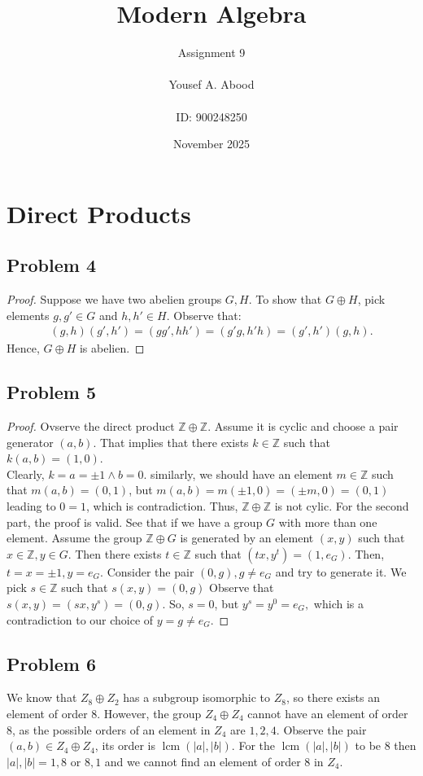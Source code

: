 \documentclass[a4paper,12pt]{article}
\title{Modern Algebra}
\author{Assignment 9\\ \\ Yousef A. Abood\\ \\ ID: 900248250}
\date{November 2025}
\begin{document}
\maketitle
\noindent\makebox[\linewidth]{\rule{15cm}{0.4pt}}
\section{Direct Products}
\subsection*{Problem 4}
\begin{proof}
    Suppose we have two abelien groups $G,H$. To show that $G \oplus H$, pick elements $g,g' \in G$ and $h,h' \in H$. Observe that:
    \begin{align*}
        (g,h)(g',h')=(gg',hh')=(g'g,h'h)=(g',h')(g,h).
    \end{align*}
    Hence, $G \oplus H$ is abelien.
\end{proof}
\subsection*{Problem 5}
\begin{proof}
    Ovserve the direct product $\mathbb{Z}\oplus \mathbb{Z}.$ Assume it is cyclic and choose a pair generator $(a,b)$. That implies that there exists $k \in \mathbb{Z}$ such that $k(a,b)=(1,0).$ \\Clearly, $k=a=\pm 1 \wedge b=0.$ similarly, we should have an element $m \in \mathbb{Z}$ such that $m(a,b)=(0,1)$, but $m(a,b)=m(\pm 1, 0)=(\pm m, 0)=(0,1)$ leading to $0=1$, which is contradiction. Thus, $\mathbb{Z} \oplus \mathbb{Z}$ is not cylic.
    For the second part, the proof is valid. See that if we have a group $G$ with more than one element. Assume the group $\mathbb{Z} \oplus G$ is generated by an element $(x,y)$ such that $x \in \mathbb{Z}, y \in G$. Then there exists $t \in \mathbb{Z}$ such that $(tx, y^t)=(1, e_G).$ Then, $t=x=\pm 1, y=e_G.$ Consider the pair $(0, g), g \ne e_G$ and try to generate it. We pick $s \in \mathbb{Z}$ such that $s(x,y)=(0, g)$
    Observe that $s(x,y)=(sx, y^s)=(0,g)$. So, $s=0$, but $y^s=y^0=e_G,$ which is a contradiction to our choice of $y=g\ne e_G$.
\end{proof}
\subsection*{Problem 6}
We know that $Z_8 \oplus Z_2$ has a subgroup isomorphic to $Z_8$, so there exists an element of order $8.$ However, the group $Z_4\oplus Z_4$ cannot have an element of order $8$, as the possible orders of an element in $Z_4$ are $1, 2, 4.$ Observe the pair $(a,b) \in Z_4 \oplus Z_4$, its order is $\operatorname{lcm}(|a|, |b|)$. For the $\operatorname{lcm}(|a|,|b|)$ to be $8$ then $|a|,|b|=1,8$ or $8,1$ and we cannot find an element of order $8$ in $Z_4.$
\end{document}
